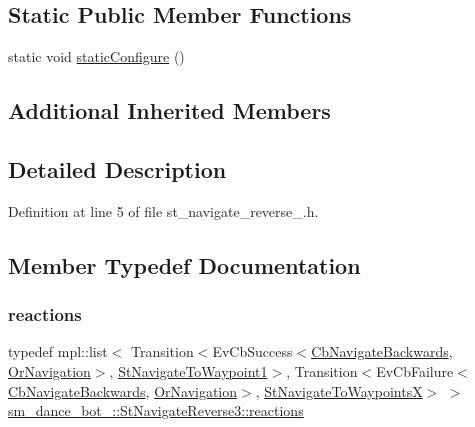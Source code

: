\subsection*{Static Public Member Functions}
\begin{DoxyCompactItemize}
\item 
static void \hyperlink{structsm__dance__bot__2_1_1StNavigateReverse3_ab9ffbcdda77a9655dc05926ba5b67692}{static\+Configure} ()
\end{DoxyCompactItemize}
\subsection*{Additional Inherited Members}


\subsection{Detailed Description}


Definition at line 5 of file st\+\_\+navigate\+\_\+reverse\+\_.\+h.



\subsection{Member Typedef Documentation}
\mbox{\label{structsm__dance__bot__2_1_1StNavigateReverse3_a58a69b307b60ea7f7fb92d5e61feb7de}} 
\subsubsection{\texorpdfstring{reactions}{reactions}}
{\footnotesize\ttfamily typedef mpl\+::list$<$ Transition$<$Ev\+Cb\+Success$<$\hyperlink{classcl__move__base__z_1_1CbNavigateBackwards}{Cb\+Navigate\+Backwards}, \hyperlink{classsm__dance__bot__2_1_1OrNavigation}{Or\+Navigation}$>$, \hyperlink{structsm__dance__bot__2_1_1StNavigateToWaypoint1}{St\+Navigate\+To\+Waypoint1}$>$, Transition$<$Ev\+Cb\+Failure$<$\hyperlink{classcl__move__base__z_1_1CbNavigateBackwards}{Cb\+Navigate\+Backwards}, \hyperlink{classsm__dance__bot__2_1_1OrNavigation}{Or\+Navigation}$>$, \hyperlink{structsm__dance__bot__2_1_1StNavigateToWaypointsX}{St\+Navigate\+To\+WaypointsX}$>$ $>$ \hyperlink{structsm__dance__bot__2_1_1StNavigateReverse3_a58a69b307b60ea7f7fb92d5e61feb7de}{sm\+\_\+dance\+\_\+bot\+\_\+::\+St\+Navigate\+Reverse3\+::reactions}}




